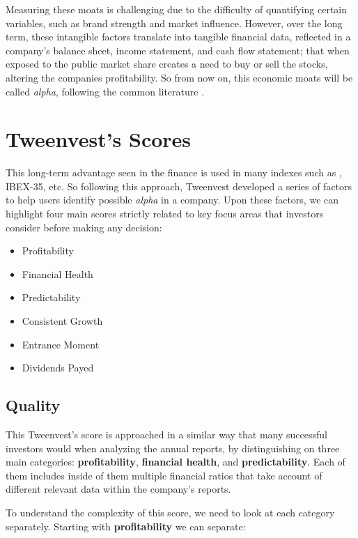 \documentclass[11pt,english,a4paper,hidelinks]{book}
\begin{document}
\vspace{0.5cm}
\noindent Measuring these moats is challenging due to the difficulty of quantifying certain variables, such as brand strength and market influence. However, over the long term, these intangible factors translate into tangible financial data, reflected in a company's balance sheet, income statement, and cash flow statement; that when exposed to the public market share creates a need to buy or sell the stocks, altering the companies profitability. So from now on, this economic moats will be called \textit{alpha}, following the common literature . 



\section{Tweenvest's Scores}

This long-term advantage seen in the finance is used in many indexes such as \textcite{msci2024fundamental}, IBEX-35, etc. So following this approach, Tweenvest developed a series of factors to help users identify possible \textit{alpha} in a company. Upon these factors, we can highlight four main scores strictly related to key focus areas that investors consider before making any decision:
\begin{itemize}
    \item Profitability
    \item Financial Health
    \item Predictability
    \item Consistent Growth
    \item Entrance Moment
    \item Dividends Payed
\end{itemize}

\subsection{Quality}

\noindent This Tweenvest's score is approached in a similar way that many successful investors would when analyzing the annual reports, by distinguishing on three main categories: \textbf{profitability}, \textbf{financial health}, and \textbf{predictability}. Each of them includes inside of them multiple financial ratios that take account of different relevant data within the company's reports.

\vspace{0.5cm}
\noindent To understand the complexity of this score, we need to look at each category separately. Starting with \textbf{profitability} we can separate:
\end{document}
